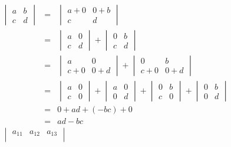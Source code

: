 \documentclass[12pt, a4paper]{article}
\begin{document}
{\noindent
\begin{math}
	\begin{array}{lcl}
		\begin{vmatrix}
			a & b \\
			c & d 
		\end{vmatrix}
		& = & 
		\begin{vmatrix}
			a+0 & 0+b \\
			c & d 
		\end{vmatrix}
		\\
		& = & 
		\begin{vmatrix}
			a & 0 \\
			c & d 
		\end{vmatrix}
		+ 
		\begin{vmatrix}
			0 & b \\
			c & d 
		\end{vmatrix}
		\\
		& = & 
		\begin{vmatrix}
			a & 0 \\
			c+0 & 0+d 
		\end{vmatrix}
		+ 
		\begin{vmatrix}
			0 & b \\
			c+0 & 0+d 
		\end{vmatrix}
		\\
		& = & 
		\begin{vmatrix}
			a & 0 \\
			c & 0 
		\end{vmatrix}
		+ 
		\begin{vmatrix}
			a & 0 \\
			0 & d 
		\end{vmatrix}
		+ 
		\begin{vmatrix}
			0 & b \\
			c & 0 
		\end{vmatrix}
		+ 
		\begin{vmatrix}
			0 & b \\
			0 & d 
		\end{vmatrix}
		\\
		& = & 
		0 + ad + (-bc) + 0
		\\
		& = & 
		ad-bc
	\end{array}	
\end{math}
\newline
\begin{math}
	\begin{array}{lcl}
		\begin{vmatrix}
			a_{11} & a_{12} & a_{13} \\

\end{vmatrix}
\end{array}
\end{math}}
\end{document}
